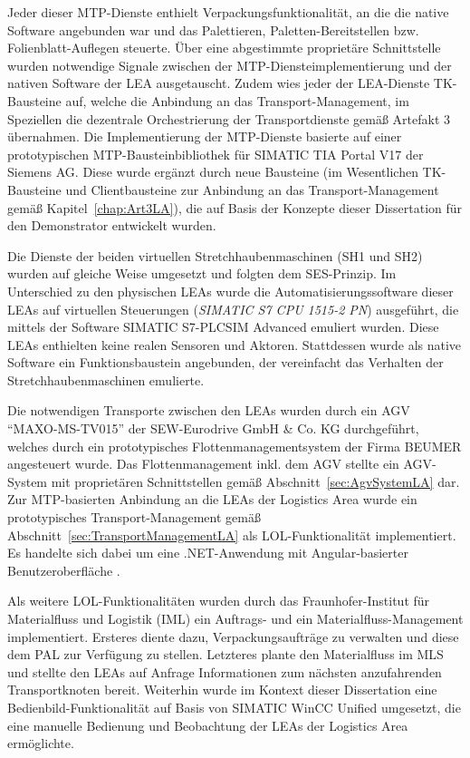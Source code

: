 Jeder dieser MTP-Dienste enthielt Verpackungsfunktionalität, an die die native Software angebunden war und das Palettieren, Paletten-Bereitstellen bzw. Fo\-li\-en\-blatt-Auflegen steuerte. Über eine abgestimmte proprietäre Schnittstelle wurden notwendige Signale zwischen der MTP-Diensteimplementierung und der nativen Software der LEA ausgetauscht. Zudem wies jeder der LEA-Dienste TK-Bausteine auf, welche die Anbindung an das Transport-Management, im Speziellen die dezentrale Orchestrierung der Transportdienste gemäß Artefakt 3 übernahmen. Die Implementierung der MTP-Dienste basierte auf einer prototypischen MTP-Bausteinbibliothek für SIMATIC TIA Portal V17 der Siemens AG. Diese wurde ergänzt durch neue Bausteine (im Wesentlichen TK-Bausteine und Clientbausteine zur Anbindung an das Transport-Management gemäß Kapitel~\ref{chap:Art3LA}), die auf Basis der Konzepte dieser Dissertation für den Demonstrator entwickelt wurden.

Die Dienste der beiden virtuellen Stretchhaubenmaschinen (SH1 und SH2) wurden auf gleiche Weise umgesetzt und folgten dem SES-Prinzip. Im Unterschied zu den physischen LEAs wurde die Automatisierungssoftware dieser LEAs auf virtuellen Steuerungen (\emph{SIMATIC S7 CPU 1515-2 PN}) ausgeführt, die mittels der Software SIMATIC S7-PLCSIM Advanced emuliert wurden. Diese LEAs enthielten keine realen Sensoren und Aktoren. Stattdessen wurde als native Software ein Funktionsbaustein angebunden, der vereinfacht das Verhalten der Stretchhaubenmaschinen emulierte.

Die notwendigen Transporte zwischen den LEAs wurden durch ein AGV \enquote{MAXO-MS-TV015} der SEW-Eurodrive GmbH \& Co. KG \cite{SEWEurodrives.2018} durchgeführt, welches durch ein prototypisches Flottenmanagementsystem der Firma BEUMER angesteuert wurde. Das Flottenmanagement inkl. dem AGV stellte ein AGV-System mit proprietären Schnittstellen gemäß Abschnitt~\ref{sec:AgvSystemLA} dar. Zur MTP-basierten Anbindung an die LEAs der Logistics Area wurde ein prototypisches Transport-Management gemäß Abschnitt~\ref{sec:TransportManagementLA} als LOL-Funktionalität implementiert. Es handelte sich dabei um eine .NET-Anwendung mit Angular-basierter Benutzeroberfläche \cite{Henkel.2022}.

Als weitere LOL-Funktionalitäten wurden durch das Fraunhofer-Institut für Materialfluss und Logistik (IML) ein Auftrags- und ein Materialfluss-Management implementiert. Ersteres diente dazu, Verpackungsaufträge zu verwalten und diese dem PAL zur Verfügung zu stellen. Letzteres plante den Materialfluss im MLS und stellte den LEAs auf Anfrage Informationen zum nächsten anzufahrenden Transportknoten bereit. Weiterhin wurde im Kontext dieser Dissertation eine Bedienbild-Funktionalität auf Basis von SIMATIC WinCC Unified umgesetzt, die eine manuelle Bedienung und Beobachtung der LEAs der Logistics Area ermöglichte.

